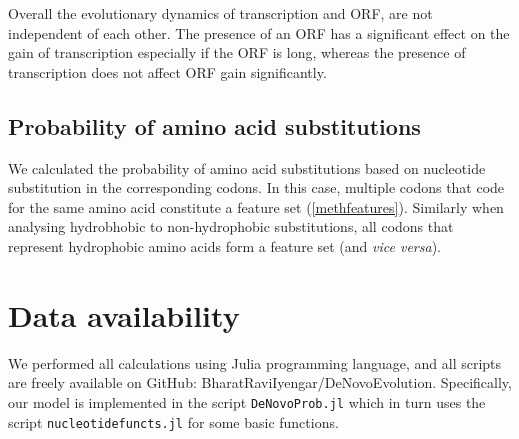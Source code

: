 \documentclass[12pt,a4paper]{article}
\begin{document}
Overall the evolutionary dynamics of transcription and ORF, are not independent of each other. The presence of an ORF has a significant effect on the gain of transcription especially if the ORF is long, whereas the presence of transcription does not affect ORF gain significantly.



\subsection{Probability of amino acid substitutions}

We calculated the probability of amino acid substitutions based on nucleotide substitution in the corresponding codons. In this case, multiple codons that code for the same amino acid constitute a feature set (\autoref{methfeatures}). Similarly when analysing hydrobhobic to non-hydrophobic substitutions, all codons that represent hydrophobic amino acids form a feature set (and \textit{vice versa}).

\section{Data availability}
We performed all calculations using Julia programming language, and all scripts are freely available on GitHub: BharatRaviIyengar/DeNovoEvolution. Specifically, our model is implemented in the script \texttt{DeNovoProb.jl} which in turn uses the script \texttt{nucleotidefuncts.jl} for some basic functions.



\small

\end{document}
